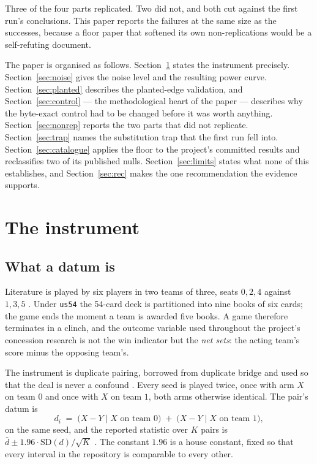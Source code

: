 \documentclass[11pt]{article}
\newcommand{\code}[1]{\texttt{#1}}
\newcommand{\usff}{\code{us54}}
\begin{document}
Three of the four parts replicated. Two did not, and both cut against the first run's conclusions.
This paper reports the failures at the same size as the successes, because a floor paper that
softened its own non-replications would be a self-refuting document.

The paper is organised as follows. Section~\ref{sec:instrument} states the instrument precisely.
Section~\ref{sec:noise} gives the noise level and the resulting power curve.
Section~\ref{sec:planted} describes the planted-edge validation, and
Section~\ref{sec:control} --- the methodological heart of the paper --- describes why the byte-exact
control had to be changed before it was worth anything. Section~\ref{sec:nonrep} reports the two
parts that did not replicate. Section~\ref{sec:trap} names the substitution trap that the first run
fell into. Section~\ref{sec:catalogue} applies the floor to the project's committed results and
reclassifies two of its published nulls. Section~\ref{sec:limits} states what none of this
establishes, and Section~\ref{sec:rec} makes the one recommendation the evidence supports.

\section{The instrument}
\label{sec:instrument}

\subsection{What a datum is}

Literature is played by six players in two teams of three, seats $0,2,4$ against $1,3,5$
\cite{v05}. Under \usff{} the 54-card deck is partitioned into nine books of six cards; the game
ends the moment a team is awarded five books. A game therefore terminates in a clinch, and the
outcome variable used throughout the project's concession research is not the win indicator but the
\emph{net sets}: the acting team's score minus the opposing team's.

The instrument is duplicate pairing, borrowed from duplicate bridge and used so that the deal is
never a confound \cite{botlab}. Every seed is played twice, once with arm $X$ on team $0$ and once
with $X$ on team $1$, both arms otherwise identical. The pair's datum is
\begin{equation}
\label{eq:datum}
d_i \;=\; \bigl(X - Y \mid X \text{ on team } 0\bigr) \;+\; \bigl(X - Y \mid X \text{ on team } 1\bigr),
\end{equation}
on the same seed, and the reported statistic over $K$ pairs is
$\bar{d} \pm 1.96 \cdot \mathrm{SD}(d)/\sqrt{K}$ \cite{probefloor}. The constant $1.96$ is a house
constant, fixed so that every interval in the repository is comparable to every other.
\end{document}
